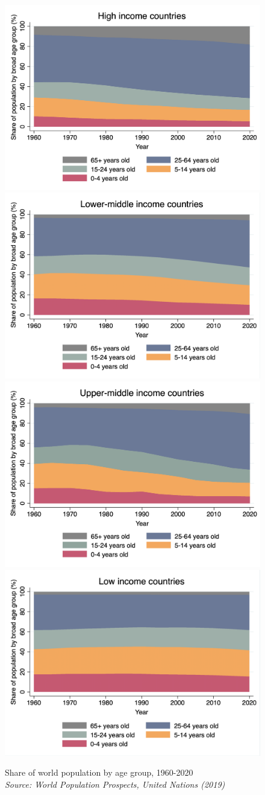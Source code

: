 \documentclass[
  a4paper, twoside, 12pt]{book}
\begin{document}
\begin{figure}[H]

{\centering \includegraphics[width=0.43\linewidth,]{figures/stacked_highincome} \includegraphics[width=0.43\linewidth,]{figures/stacked_lowermiddle} \includegraphics[width=0.43\linewidth,]{figures/stacked_highermiddle} \includegraphics[width=0.43\linewidth,]{figures/stacked_lowincome} 

}

\caption[Share of world population by age group, 1960-2020]{Share of world population by age group, 1960-2020 \\ \textit{\footnotesize{Source: World Population Prospects, United Nations (2019)}}}\label{fig:fig-stacked}
\end{figure}
\end{document}
